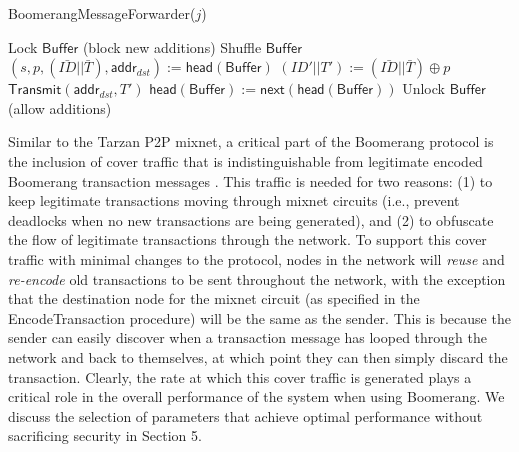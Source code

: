 \begin{algorithm}[t!]
\caption{{\sf BoomerangMessageForwarder}($j$)}
\label{alg:handler}
\begin{algorithmic}[1]

\State Lock $\mathsf{Buffer}$ (block new additions)
\State Shuffle $\mathsf{Buffer}$
	\State $(s, p, (\bar{ID} || \bar{T}), \mathsf{addr}_{dst}) := \mathsf{head}(\mathsf{Buffer})$
	\State $(ID' || T') := (\bar{ID} || \bar{T}) \oplus p$
	\State $\mathsf{Transmit}(\mathsf{addr}_{dst}, T')$
	\State $\mathsf{head}(\mathsf{Buffer}) := \mathsf{next}(\mathsf{head}(\mathsf{Buffer}))$
\EndFor
\State Unlock $\mathsf{Buffer}$ (allow additions)


\end{algorithmic}
\end{algorithm}

Similar to the Tarzan P2P mixnet, a critical part of the Boomerang protocol is the inclusion of cover traffic that is indistinguishable from legitimate encoded Boomerang transaction messages \cite{tarzan}. This traffic is needed for two reasons: (1) to keep legitimate transactions moving through mixnet circuits (i.e., prevent deadlocks when no new transactions are being generated), and (2) to obfuscate the flow of legitimate transactions through the network. To support this cover traffic with minimal changes to the protocol, nodes in the network will \emph{reuse} and \emph{re-encode} old transactions to be sent throughout the network, with the exception that the destination node for the mixnet circuit (as specified in the {\sf EncodeTransaction} procedure) will be the same as the sender. This is because the sender can easily discover when a transaction message has looped through the network and back to themselves, at which point they can then simply discard the transaction. Clearly, the rate at which this cover traffic is generated plays a critical role in the overall performance of the system when using Boomerang. We discuss the selection of parameters that achieve optimal performance without sacrificing security in Section 5. 

